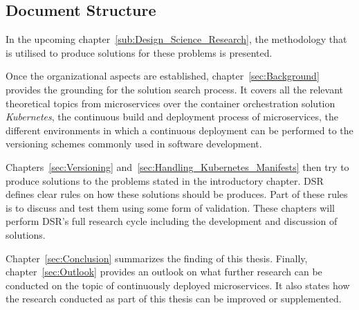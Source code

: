 
\subsection{Document Structure}%
\label{sub:Document Structure}

In the upcoming chapter~\ref{sub:Design_Science_Research}, the methodology that
is utilised to produce solutions for these problems is presented.

Once the organizational aspects are established, chapter~\ref{sec:Background}
provides the grounding for the solution search process. It covers all the
relevant theoretical topics from microservices over the container orchestration
solution \textit{Kubernetes}, the continuous build and deployment process of
microservices, the different environments in which a continuous deployment can
be performed to the versioning schemes commonly used in software development.

Chapters~\ref{sec:Versioning} and~\ref{sec:Handling_Kubernetes_Manifests} then
try to produce solutions to the problems stated in the introductory chapter.
\acf{DSR} defines clear rules on how these solutions should be produces. Part
of these rules is to discuss and test them using some form of validation. These
chapters will perform \acs{DSR}'s full research cycle including the development
and discussion of solutions.

Chapter~\ref{sec:Conclusion} summarizes the finding of this thesis. Finally,
chapter~\ref{sec:Outlook} provides an outlook on what further research can be
conducted on the topic of continuously deployed microservices. It also states
how the research conducted as part of this thesis can be improved or
supplemented.
